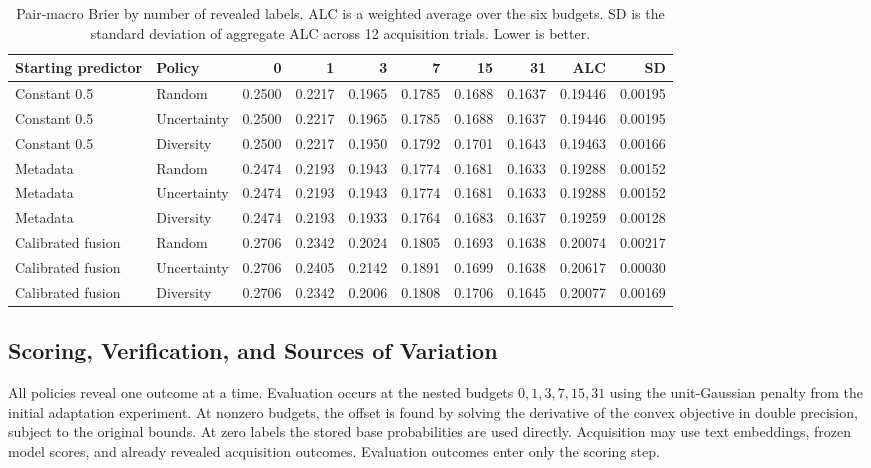 \documentclass[conference]{IEEEtran}
\begin{document}
\begin{table}[t]
\caption{Pair-macro Brier by number of revealed labels. ALC is a weighted average over the six budgets. SD is the standard deviation of aggregate ALC across 12 acquisition trials. Lower is better.}
\label{tab:label_budgets}
\centering\small
\begin{tabular}{@{}llrrrrrrrr@{}}
\toprule
Starting predictor & Policy & 0 & 1 & 3 & 7 & 15 & 31 & ALC & SD \\
\midrule
Constant 0.5 & Random & 0.2500 & 0.2217 & 0.1965 & 0.1785 & 0.1688 & 0.1637 & 0.19446 & 0.00195 \\
Constant 0.5 & Uncertainty & 0.2500 & 0.2217 & 0.1965 & 0.1785 & 0.1688 & 0.1637 & 0.19446 & 0.00195 \\
Constant 0.5 & Diversity & 0.2500 & 0.2217 & 0.1950 & 0.1792 & 0.1701 & 0.1643 & 0.19463 & 0.00166 \\
\addlinespace[2pt]
Metadata & Random & 0.2474 & 0.2193 & 0.1943 & 0.1774 & 0.1681 & 0.1633 & 0.19288 & 0.00152 \\
Metadata & Uncertainty & 0.2474 & 0.2193 & 0.1943 & 0.1774 & 0.1681 & 0.1633 & 0.19288 & 0.00152 \\
Metadata & Diversity & 0.2474 & 0.2193 & 0.1933 & 0.1764 & 0.1683 & 0.1637 & 0.19259 & 0.00128 \\
\addlinespace[2pt]
Calibrated fusion & Random & 0.2706 & 0.2342 & 0.2024 & 0.1805 & 0.1693 & 0.1638 & 0.20074 & 0.00217 \\
Calibrated fusion & Uncertainty & 0.2706 & 0.2405 & 0.2142 & 0.1891 & 0.1699 & 0.1638 & 0.20617 & 0.00030 \\
Calibrated fusion & Diversity & 0.2706 & 0.2342 & 0.2006 & 0.1808 & 0.1706 & 0.1645 & 0.20077 & 0.00169 \\
\bottomrule
\end{tabular}
\end{table}

\subsection{Scoring, Verification, and Sources of Variation}
All policies reveal one outcome at a time. Evaluation occurs at the nested budgets $0,1,3,7,15,31$ using the unit-Gaussian penalty from the initial adaptation experiment. At nonzero budgets, the offset is found by solving the derivative of the convex objective in double precision, subject to the original bounds. At zero labels the stored base probabilities are used directly. Acquisition may use text embeddings, frozen model scores, and already revealed acquisition outcomes. Evaluation outcomes enter only the scoring step.
\end{document}
